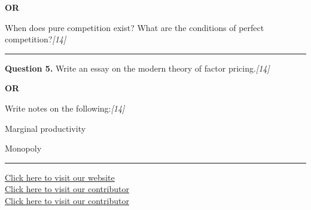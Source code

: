 \documentclass[11pt,a4paper]{article}
\newcommand{\pts}[1]{\hfill   \textit{[#1]}}
\begin{document}
\centerline{   \textbf{OR}}

When does pure competition exist? What are the conditions of perfect competition?\pts{14}

\medskip\rule{\linewidth}{0.2pt}




\noindent   \textbf{Question 5.}
Write an essay on the modern theory of factor pricing.\pts{14}

\centerline{   \textbf{OR}}

Write notes on the following:\pts{14}

\begin{parts}
  \item Marginal productivity
  \item Monopoly
\end{parts}

\vfill
\rule{\linewidth}{0.4pt}

\begin{center}\small
\href{https://bhu-exam.vercel.app/}{Click here to visit our website}\\[4pt]
\href{https://me-aryan.vercel.app/}{Click here to visit our contributor}\\[4pt]
\href{https://quashan-me.vercel.app/}{Click here to visit our contributor}
\end{center}
\end{document}
